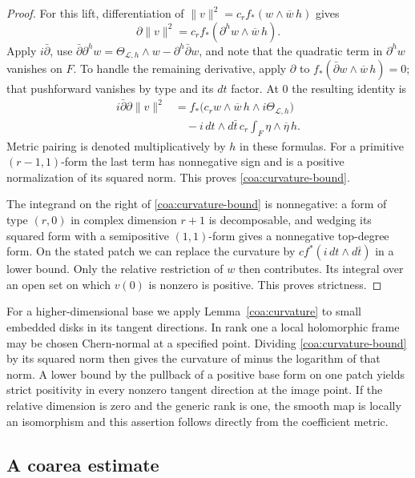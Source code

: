 \begin{proof}
For this lift, differentiation of
$\|v\|^2=c_r f_*(w\wedge\overline w\,h)$ gives
\[
 \partial\|v\|^2
   =c_r f_*(\partial^h w\wedge\overline w\,h).
\]
Apply $i\bar\partial$, use
$\bar\partial\partial^h w
 =\Theta_{\mathcal L,h}\wedge w-\partial^h\bar\partial w$,
and note that the quadratic term in $\partial^h w$ vanishes on $F$.
To handle the remaining derivative, apply $\partial$ to
$f_*(\bar\partial w\wedge\overline w\,h)=0$; that pushforward vanishes
by type and its $dt$ factor.  At $0$ the resulting identity is
\begin{equation}\label{coa:primitive-identity}
 \begin{split}
 i\bar\partial\partial\|v\|^2
 &= f_*\bigl(c_r w\wedge\overline w\,h
                         \wedge i\Theta_{\mathcal L,h}\bigr)\\
 &\quad-i\,dt\wedge d\bar t\,
                  c_r\int_F\eta\wedge\overline\eta\,h.
 \end{split}
\end{equation}
Metric pairing is denoted multiplicatively by $h$ in these formulas.
For a primitive $(r-1,1)$-form the last term has nonnegative sign and is
a positive normalization of its squared norm.  This proves
\eqref{coa:curvature-bound}.

The integrand on the right of \eqref{coa:curvature-bound} is nonnegative:
a form of type $(r,0)$ in complex dimension $r+1$ is decomposable, and
wedging its squared form with a semipositive $(1,1)$-form gives a
nonnegative top-degree form.  On the stated patch we can replace the
curvature by $c f^*(i\,dt\wedge d\bar t)$ in a lower bound.  Only the
relative restriction of $w$ then contributes.  Its integral over an open
set on which $v(0)$ is nonzero is positive.  This proves strictness.
\end{proof}

For a higher-dimensional base we apply Lemma~\ref{coa:curvature} to small
embedded disks in its tangent directions.  In rank one a local holomorphic
frame may be chosen Chern-normal at a specified point.  Dividing
\eqref{coa:curvature-bound} by its squared norm then gives the curvature
of minus the logarithm of that norm.  A lower bound by the pullback of a
positive base form on one patch yields strict positivity in every
nonzero tangent direction at the image point.  If the relative dimension
is zero and the generic rank is one, the smooth map is locally an
isomorphism and this assertion follows directly from the coefficient
metric.

\subsection{A coarea estimate}

